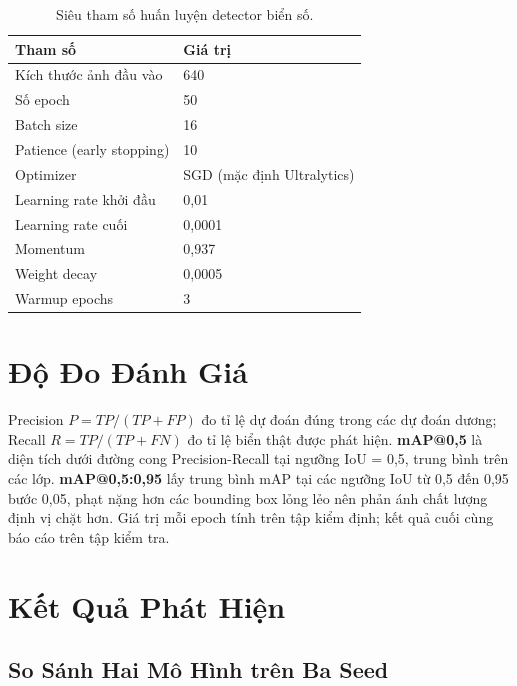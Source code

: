 \begin{table}[htbp]
\centering
\caption{Siêu tham số huấn luyện detector biển số.}

\label{tab:det-hyperparam}
\begin{tabular}{ll}
\toprule
\textbf{Tham số} & \textbf{Giá trị} \\
\midrule
Kích thước ảnh đầu vào & 640 \\
Số epoch & 50 \\
Batch size & 16 \\
Patience (early stopping) & 10 \\
Optimizer & SGD (mặc định Ultralytics) \\
Learning rate khởi đầu & 0,01 \\
Learning rate cuối & 0,0001 \\
Momentum & 0,937 \\
Weight decay & 0,0005 \\
Warmup epochs & 3 \\
\bottomrule
\end{tabular}
\end{table}

\section{Độ Đo Đánh Giá}
\label{sec:phathien-dodo}

Precision $P = TP/(TP+FP)$ đo tỉ lệ dự đoán đúng trong các dự đoán dương; Recall
$R = TP/(TP+FN)$ đo tỉ lệ biển thật được phát hiện. \textbf{mAP@0,5} là diện tích dưới đường cong Precision-Recall tại ngưỡng IoU = 0,5,
trung bình trên các lớp.
\textbf{mAP@0,5:0,95} lấy trung bình mAP tại các ngưỡng IoU từ 0,5 đến 0,95 bước 0,05, phạt
nặng hơn các bounding box lỏng lẻo nên phản ánh chất lượng định vị chặt hơn. Giá trị mỗi
epoch tính trên tập kiểm định; kết quả cuối cùng báo cáo trên tập kiểm tra.

\section{Kết Quả Phát Hiện}
\label{sec:phathien-ketqua}

\subsection{So Sánh Hai Mô Hình trên Ba Seed}

